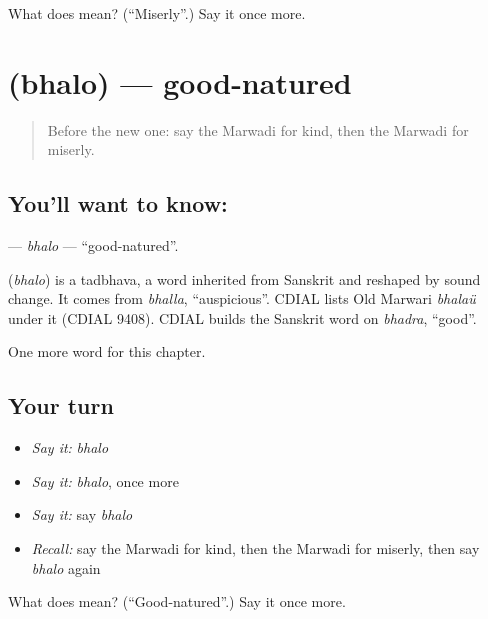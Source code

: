 \begin{tcolorbox}[breakable,colback=teal!4,colframe=teal!35!black,title={Before you move on}]
What does  mean? (\textquotedblleft{}Miserly\textquotedblright{}.) Say it once more.
\end{tcolorbox}
\section[\texorpdfstring{\mw{भलो} (bhalo)}{भलो (bhalo)}]{ (bhalo) — good-natured}

\label{lesson:MW-C147-bhalo}



\begin{quote}
Before the new one: say the Marwadi for kind, then the Marwadi for miserly.
\end{quote}

\subsection*{You'll want to know: }
\textbf{} — \emph{bhalo} — \textquotedblleft{}good-natured\textquotedblright{}.

\begin{cousinweb}
\textbf{} (\emph{bhalo}) is a tadbhava, a word inherited from Sanskrit and reshaped by sound change. It comes from \emph{bhalla}, \textquotedblleft{}auspicious\textquotedblright{}. CDIAL lists Old Marwari \emph{bhalaü} under it (CDIAL 9408). CDIAL builds the Sanskrit word on \emph{bhadra}, \textquotedblleft{}good\textquotedblright{}.
\end{cousinweb}

\begin{grammarlens}[title={What you've built}]
One more word for this chapter.
\end{grammarlens}

\subsection*{Your turn}
\begin{itemize}
\raggedright
  \item \emph{Say it:} \emph{bhalo}
  \item \emph{Say it:} \emph{bhalo}, once more
  \item \emph{Say it:} say \emph{bhalo}
  \item \emph{Recall:} say the Marwadi for kind, then the Marwadi for miserly, then say \emph{bhalo} again
\end{itemize}

\begin{tcolorbox}[breakable,colback=teal!4,colframe=teal!35!black,title={Before you move on}]
What does  mean? (\textquotedblleft{}Good-natured\textquotedblright{}.) Say it once more.
\end{tcolorbox}
